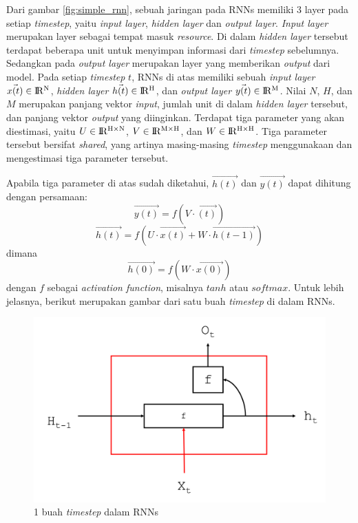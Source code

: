 Dari gambar \ref{fig:simple_rnn}, sebuah jaringan pada RNNs memiliki 3 layer pada setiap \textit{timestep}, yaitu \textit{input layer}, \textit{hidden layer} dan \textit{output layer}. \textit{Input layer} merupakan layer sebagai tempat masuk \textit{resource}. Di dalam \textit{hidden layer} tersebut terdapat beberapa unit untuk menyimpan informasi dari \textit{timestep} sebelumnya. Sedangkan pada \textit{output layer} merupakan layer yang memberikan \textit{output} dari model. Pada setiap \textit{timestep} $ t $, RNNs di atas memiliki sebuah \textit{input layer} $ \vec{x(t)} \in {\rm I\!R^{N}} $, \textit{hidden layer} $ \vec{h(t)} \in {\rm I\!R^{H}} $, dan \textit{output layer} $ \vec{y(t)} \in {\rm I\!R^{M}} $. Nilai $ N $, $ H $, dan $ M $ merupakan panjang vektor \textit{input}, jumlah unit di dalam \textit{hidden layer} tersebut, dan panjang vektor \textit{output} yang diinginkan. Terdapat tiga parameter yang akan diestimasi, yaitu $ U \in {\rm I\!R^{H \times N }} $, $ V \in {\rm I\!R^{M \times H}}$, dan $ W \in {\rm I\!R^{H \times H}}$. Tiga parameter tersebut bersifat \textit{shared}, yang artinya masing-masing \textit{timestep} menggunakaan dan mengestimasi tiga parameter tersebut.

Apabila tiga parameter di atas sudah diketahui, $ \vec{h(t)} $ dan $ \vec{y(t)} $ dapat dihitung dengan persamaan:
\begin{equation}
\vec{y(t)} = f(V \cdot \vec{(t)})
\end{equation}
\begin{equation}
\vec{h(t)} = f(U \cdot \vec{x(t)} + W \cdot \vec{h(t-1)})
\end{equation}
dimana
\begin{equation}
\vec{h(0)} = f(W \cdot \vec{x(0)})
\end{equation}
dengan $ f $ sebagai \textit{activation function}, misalnya $ tanh $ atau $ softmax $. Untuk lebih jelasnya, berikut merupakan gambar dari satu buah \textit{timestep} di dalam RNNs.
\begin{figure}
	\centering
	\includegraphics[width=0.80\linewidth]{images/nodes_rnn}
	\caption{1 buah \textit{timestep} dalam RNNs}
	\label{fig:nodes_rnn}
\end{figure}

